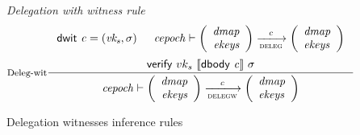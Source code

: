 \begin{figure}
  \emph{Delegation with witness rule}
  \begin{equation}
    \label{eq:deleg-witnesses}
    \inference[Deleg-wit]
    { \dwit{c} = (\var{vk_s}, \sigma)
      & \var{cepoch} \vdash
      {\left(
        \begin{array}{r}
          \var{dmap}\\
          \var{ekeys}
        \end{array}
      \right)}
      \trans{deleg}{c}
      {\left(
      \begin{array}{l}
          \var{dmap}\\
          \var{ekeys}
      \end{array}
      \right)}
      \\ ~ \\
      \verify{vk_s}{\serialised{\dbody{c}}}{\sigma}
    }
    {\var{cepoch} \vdash
      {\left(
        \begin{array}{r}
          \var{dmap}\\
          \var{ekeys}
        \end{array}
      \right)}
      \trans{delegw}{c}
      {\left(
      \begin{array}{l}
          \var{dmap}\\
          \var{ekeys}
      \end{array}
      \right)}}
  \end{equation}
  \caption{Delegation witnesses inference rules}
  \label{fig:deleg-witnesses}
\end{figure}
